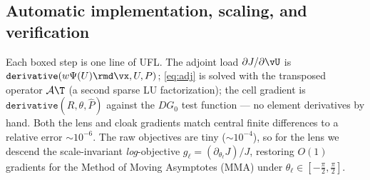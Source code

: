 \subsection{Automatic implementation, scaling, and verification}
Each boxed step is one line of UFL. The adjoint load $\partial J/\partial\vU$ is
$\texttt{derivative}(w\Psi(U)\rmd\vx,U,P)$; \eqref{eq:adj} is solved with the
transposed operator $\mathcal A\T$ (a second sparse LU factorization); the cell gradient is
$\texttt{derivative}(R,\theta,\hat P)$ against the $DG_0$ test function --- no
element derivatives by hand. Both the lens and cloak gradients match central
finite differences to a relative error $\sim\!10^{-6}$. The raw objectives are
tiny ($\sim\!10^{-4}$), so for the lens we descend the scale-invariant
\emph{log}-objective $g_\ell=(\partial_{\theta_\ell}J)/J$, restoring $O(1)$
gradients for the Method of Moving Asymptotes (MMA) \cite{svanberg1987} under
$\theta_\ell\in[-\tfrac\pi2,\tfrac\pi2]$.

